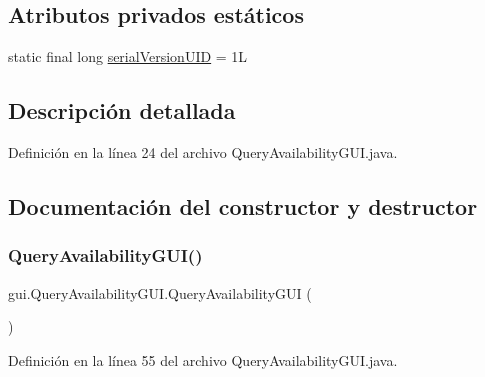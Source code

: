 \subsection*{Atributos privados estáticos}
\begin{DoxyCompactItemize}
\item 
static final long \mbox{\hyperlink{classgui_1_1_query_availability_g_u_i_a38c879a8197de97530ee71ac78f95acc}{serial\+Version\+U\+ID}} = 1L
\end{DoxyCompactItemize}


\subsection{Descripción detallada}


Definición en la línea 24 del archivo Query\+Availability\+G\+U\+I.\+java.



\subsection{Documentación del constructor y destructor}
\mbox{\label{classgui_1_1_query_availability_g_u_i_a098dc51a0df6dd658bdd9a70231cbe3b}} 
\subsubsection{\texorpdfstring{QueryAvailabilityGUI()}{QueryAvailabilityGUI()}}
{\footnotesize\ttfamily gui.\+Query\+Availability\+G\+U\+I.\+Query\+Availability\+G\+UI (\begin{DoxyParamCaption}{ }\end{DoxyParamCaption})}



Definición en la línea 55 del archivo Query\+Availability\+G\+U\+I.\+java.


\begin{DoxyCode}{0}

\end{DoxyCode}


